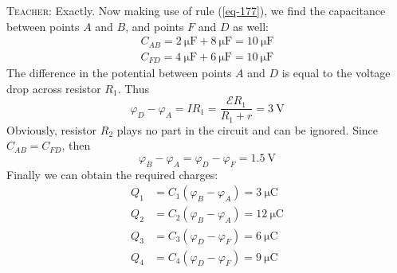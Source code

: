 \documentclass[a4paper,sfsidenotes]{tufte-book}
\newcommand{\Ea}{\mathcal{E}}
\begin{document}
\textsc{Teacher:} Exactly. Now making use of rule (\ref{eq-177}), we find the capacitance between points $A$ and $B$, and points $F$ and $D$ as well:
\begin{eqnarray*}
C_{AB} = \SI{2}{\micro \farad} + \SI{8}{\micro \farad} =  \SI{10}{\micro \farad} \\
C_{FD} = \SI{4}{\micro \farad} + \SI{6}{\micro \farad} =  \SI{10}{\micro \farad}
\end{eqnarray*}
The difference in the potential between points $A$ and $D$ is equal to the voltage drop across resistor $R_{1}$. Thus 
\begin{equation*}
\varphi_{D} - \varphi_{A} = IR_{1} = \frac{\Ea R_{1}}{R_{1} + r} = \SI{3}{\volt}
\end{equation*}
Obviously, resistor $R_{2}$ plays no part in the circuit and can be ignored.  Since $C_{AB} = C_{FD}$, then
\begin{equation*}
\varphi_{B} - \varphi_{A} = \varphi_{D} - \varphi_{F} = \SI{1.5}{\volt}
\end{equation*}
Finally we can obtain the required charges:
\begin{align*}
Q_{1} &= C_{1}(\varphi_{B} - \varphi_{A}) =  \SI{3}{\micro \coulomb} \\
Q_{2} &= C_{2}(\varphi_{B} - \varphi_{A}) =  \SI{12}{\micro \coulomb} \\
Q_{3} &= C_{3}(\varphi_{D} - \varphi_{F}) =  \SI{6}{\micro \coulomb}\\
Q_{4} &= C_{4}(\varphi_{D} - \varphi_{F}) =  \SI{9}{\micro \coulomb} \\
\end{align*}
\end{document}
